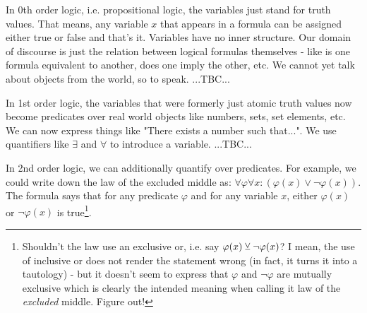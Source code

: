\medskip
In 0th order logic, i.e. propositional logic, the variables just stand for truth values. That means, any variable $x$ that appears in a formula can be assigned either true or false and that's it. Variables have no inner structure. Our domain of discourse is just the relation between logical formulas themselves - like is one formula equivalent to another, does one imply the other, etc. We cannot yet talk about objects from the world, so to speak. ...TBC...


\medskip
In 1st order logic, the variables that were formerly just atomic truth values now become predicates over real world objects like numbers, sets, set elements, etc. We can now express things like "There exists a number such that...". We use quantifiers like $\exists$ and $\forall$ to introduce a variable. ...TBC...

\medskip
In 2nd order logic, we can additionally quantify over predicates. For example, we could write down the law of the excluded middle as: $\forall \varphi \forall x: (\varphi(x) \vee \neg \varphi(x))$. The formula says that for any predicate $\varphi$ and for any variable $x$, either $\varphi(x)$ or $\neg \varphi(x)$ is true\footnote{Shouldn't the law use an exclusive or, i.e. say $\varphi(x) \mathbin{\veebar} \neg \varphi(x)$? I mean, the use of inclusive or does not render the statement wrong (in fact, it turns it into a tautology) - but it doesn't seem to express that $\varphi$ and $\neg \varphi$ are mutually exclusive which is clearly the intended meaning when calling it law of the \emph{excluded} middle. Figure out!}.











